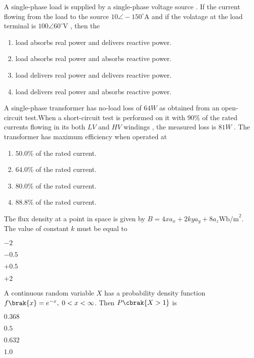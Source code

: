 \item A single-phase load is supplied by a single-phase voltage source . If the current flowing from the load to the source $10\angle -150^\circ $A and if the volatage at the load terminal is  $100\angle 60^\circ$V , then the
\begin{enumerate}
\item load absorbs real power and delivers reactive power. 
\item load absorbs real power and absorbs reactive power.
\item load delivers real power and delivers reactive power.
\item load delivers real power and absorbs reactive power.
\end{enumerate}
\newpage
\item A single-phase transformer has no-load loss of $64W$ as obtained from an open-circuit test.When a short-circuit test is performed on it with $90\%$ of the rated currents flowing in its both $LV$ and $HV$ windings , the measured loss is $81W$ . The transformer  has maximum efficiency when operated at 
\begin{enumerate}
\item $ 50.0\% $ of the rated current.
\item $ 64.0\% $ of the rated current.
\item $ 80.0\% $ of the rated current.
\item $ 88.8\% $ of the rated current.
\end{enumerate}
\item The flux density at a point in space is given by $B = 4xa_x + 2k ya_y + 8a_z\text{Wb/m}^2$. The value of constant $k$ must be equal to
\begin{enumerate}
\begin{multicols}{4}
\item $-2$
\item $-0.5$
\item $+0.5$
\item $+2$
\end{multicols}
\end{enumerate}
\item A continuous random variable $X$ has a probability density function $f\brak{x} = e^{-x}, \; 0 < x < \infty$. Then $P\cbrak{ X > 1 }$ is
\begin{enumerate}
\begin{multicols}{4}
\item $0.368$
\item $0.5$
\item $0.632$
\item $1.0$ 
\end{multicols}
\end{enumerate} 
